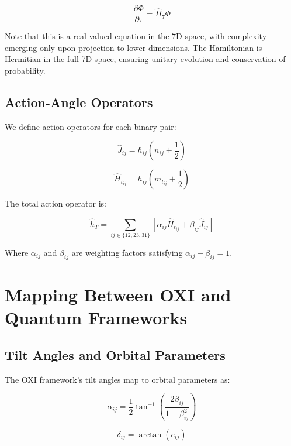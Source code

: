 \documentclass{article}
\begin{document}
\begin{equation}
\frac{\partial \Phi}{\partial \tau} = \hat{H}_7 \Phi
\end{equation}

Note that this is a real-valued equation in the 7D space, with complexity emerging only upon projection to lower dimensions. The Hamiltonian is Hermitian in the full 7D space, ensuring unitary evolution and conservation of probability.

\subsection{Action-Angle Operators}

We define action operators for each binary pair:

\begin{equation}
\hat{J}_{ij} = \hbar_{ij}(n_{ij} + \frac{1}{2})
\end{equation}

\begin{equation}
\hat{H}_{t_{ij}} = h_{ij}(m_{t_{ij}} + \frac{1}{2})
\end{equation}

The total action operator is:

\begin{equation}
\hat{h}_T = \sum_{ij \in \{12,23,31\}} [\alpha_{ij}\hat{H}_{t_{ij}} + \beta_{ij}\hat{J}_{ij}]
\end{equation}

Where $\alpha_{ij}$ and $\beta_{ij}$ are weighting factors satisfying $\alpha_{ij} + \beta_{ij} = 1$.

\section{Mapping Between OXI and Quantum Frameworks}

\subsection{Tilt Angles and Orbital Parameters}

The OXI framework's tilt angles map to orbital parameters as:

\begin{equation}
\alpha_{ij} = \frac{1}{2}\tan^{-1}\left(\frac{2\beta_{ij}}{1-\beta_{ij}^2}\right)
\end{equation}

\begin{equation}
\delta_{ij} = \arctan(e_{ij})
\end{equation}
\end{document}
